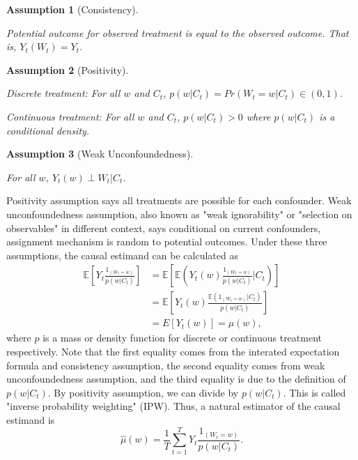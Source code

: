 \documentclass[12pt]{article}
\newtheorem{asm}{Assumption}
\begin{document}
\begin{asm}[Consistency]\label{asm:consistency}\hfill

	Potential outcome for observed treatment is equal to the observed outcome.
	That is, $Y_t(W_t) = Y_t$.
\end{asm}

\begin{asm}[Positivity]\label{asm:positivity}\hfill

	Discrete treatment:
	For all $w$ and $C_t$, $p(w\lvert C_t) = Pr\left ( W_t = w \lvert C_t\right ) \in (0, 1)$.

	Continuous treatment:
	For all $w$ and $C_t$, $p(w\lvert C_t) > 0$ where $p(w\lvert C_t)$ is a conditional density.
\end{asm}


\begin{asm}[Weak Unconfoundedness]\label{asm:unconfoundedness} \hfill

	For all $w$, $Y_{t}(w) \perp W_t \lvert C_t$.
\end{asm}


Positivity assumption says all treatments are possible for each confounder.
Weak unconfoundedness assumption, 
also known as "weak ignorability" or "selection on observables" in different context, says
conditional on current confounders, assignment mechanism is random to potential outcomes.
Under these three assumptions, the causal estimand can be calculated as
\[
	\begin{split}
		\mathbb{E}\left[ Y_t\frac{1_{(W_t = w)}}{p(w\lvert C_t)} \right]
		& = \mathbb{E}\left[ \mathbb{E}\left( Y_t(w) \frac{1_{(W_t = w)}}{p(w\lvert C_t)} \lvert C_t\right)\right]\\
		& = \mathbb{E}\left[ Y_t(w)\frac{\mathbb{E}\left( 1_{(W_t = w)}\lvert C_t \right)}{p(w\lvert C_t)} \right]\\
		& = E\left[ Y_t(w) \right] = \mu(w),
	\end{split}
\]
where $p$ is a mass or density function for discrete or continuous treatment respectively.
Note that the first equality comes from the interated expectation formula and consistency assumption,
the second equality comes from weak unconfoundedness assumption,
and the third equality is due to the definition of $p(w\lvert C_t)$.
By positivity assumption, we can divide by $p(w\lvert C_t)$.
This is called "inverse probability weighting" (IPW).
Thus, a natural estimator of the causal estimand is
\[
	\hat{\mu}(w) = \frac{1}{T}\sum_{t = 1}^T Y_t \frac{1_{(W_t = w)}}{p(w\lvert C_t)}.	
\]
\end{document}
